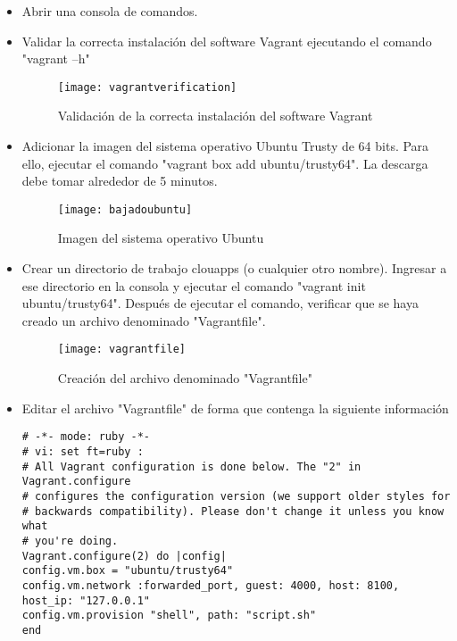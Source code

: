 \documentclass[10pt]{article}   			%
\begin{document}
\begin{itemize}		

\item Abrir una consola de comandos. 
\item Validar la correcta instalación del software Vagrant ejecutando el comando "vagrant –h"
\begin{figure}[ht] 
	\centering
		\texttt{[image: vagrantverification]}   
	\caption{Validación de la correcta instalación del software Vagrant} \label{fig:vagrantverification}
\end{figure}

\item Adicionar la imagen del sistema operativo Ubuntu Trusty de 64 bits. Para ello, ejecutar el comando "vagrant box add ubuntu/trusty64". La descarga debe tomar alrededor de 5 minutos.
\begin{figure}[ht] 
	\centering
		\texttt{[image: bajadoubuntu]}   
	\caption{Imagen del sistema operativo Ubuntu} \label{fig:bajadoubuntu}
\end{figure}

\item Crear un directorio de trabajo clouapps (o cualquier otro nombre). Ingresar a ese directorio en la consola y ejecutar el comando "vagrant init ubuntu/trusty64". Después de ejecutar el comando, verificar que se haya creado un archivo denominado "Vagrantfile".
\begin{figure}[ht] 
	\centering
		\texttt{[image: vagrantfile]}   
	\caption{ Creación del archivo denominado "Vagrantfile"} \label{fig:vagrantfile}
\end{figure}

\item Editar el archivo "Vagrantfile" de forma que contenga la siguiente información
	\begin{small}
	\begin{lstlisting}[frame=single,style=base]	
# -*- mode: ruby -*-
# vi: set ft=ruby :
# All Vagrant configuration is done below. The "2" in Vagrant.configure
# configures the configuration version (we support older styles for
# backwards compatibility). Please don't change it unless you know what
# you're doing.
Vagrant.configure(2) do |config|
config.vm.box = "ubuntu/trusty64"
config.vm.network :forwarded_port, guest: 4000, host: 8100, host_ip: "127.0.0.1"
config.vm.provision "shell", path: "script.sh"
end
	\end{lstlisting}
	\end{small}


\end{itemize}
\end{document}
